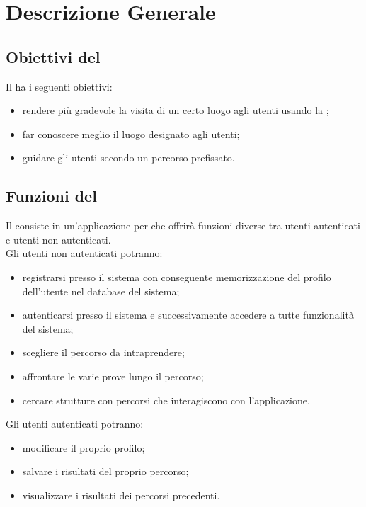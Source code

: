\section{Descrizione Generale}
\label{sec:DescrizioneGenerale}

	\subsection{Obiettivi del }
	\label{sec:ObiettiviDelProdotto}
		Il  ha i seguenti obiettivi:
		\begin{itemize}
			\item rendere più gradevole la visita di un certo luogo agli utenti usando la ;
			\item far conoscere meglio il luogo designato agli utenti;
			\item guidare gli utenti secondo un percorso prefissato.
		\end{itemize}
	
	\subsection{Funzioni del }
	\label{sub:Funzioni del Prodotto}
		Il  consiste in un'applicazione per  che offrirà funzioni diverse tra utenti autenticati e utenti non autenticati. \\
		Gli utenti non autenticati potranno:
		\begin{itemize}
			\item registrarsi presso il sistema con conseguente memorizzazione del profilo dell'utente nel database del sistema;
			\item autenticarsi presso il sistema e successivamente accedere a tutte funzionalità del sistema;
			\item scegliere il percorso da intraprendere;
			\item affrontare le varie prove lungo il percorso;
			\item cercare strutture con percorsi che interagiscono con l'applicazione.
		\end{itemize}
		Gli utenti autenticati potranno:
		\begin{itemize}
			\item modificare il proprio profilo;
			\item salvare i risultati del proprio percorso;
			\item visualizzare i risultati dei percorsi precedenti.
		\end{itemize}
	
